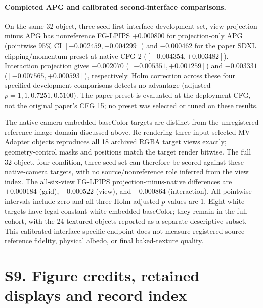 \documentclass[11pt]{article}
\begin{document}
\paragraph{Completed APG and calibrated second-interface comparisons.}
On the same 32-object, three-seed first-interface development set, view
projection minus APG has nonreference FG-LPIPS $+0.000800$ for projection-only
APG (pointwise 95\% CI $[-0.002459,+0.004299]$) and $-0.000462$ for the
paper SDXL clipping/momentum preset at native CFG 2
($[-0.004354,+0.003482]$). Interaction projection gives $-0.002070$
($[-0.005351,+0.001259]$) and $-0.003331$
($[-0.007565,+0.000593]$), respectively. Holm correction across these four
specified development comparisons detects no advantage (adjusted
$p=1,1,0.7251,0.5100$). The paper preset is evaluated at the deployment CFG,
not the original paper's CFG 15; no preset was selected or tuned on these results.

The native-camera embedded-baseColor targets are distinct from the unregistered
reference-image domain discussed above. Re-rendering three input-selected
MV-Adapter objects reproduces all 18 archived RGBA target views exactly;
geometry-control masks and positions match the target render bitwise.
The full 32-object, four-condition, three-seed set can therefore be scored
against these native-camera targets, with no source/nonreference role inferred
from the view index. The all-six-view FG-LPIPS projection-minus-native
differences are $+0.000184$ (grid), $-0.000522$ (view), and $-0.000864$
(interaction). All pointwise intervals include zero and all three Holm-adjusted
$p$ values are 1. Eight white targets have legal constant-white embedded
baseColor; they remain in the full cohort, with the 24 textured objects reported
as a separate descriptive subset. This calibrated interface-specific endpoint
does not measure registered source-reference fidelity, physical albedo, or
final baked-texture quality.

\FloatBarrier
\section*{S9. Figure credits, retained displays and record index}
\label{supp:group9}
\end{document}
